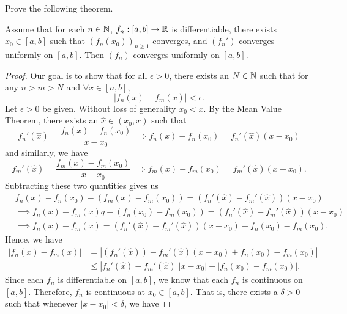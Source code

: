 \documentclass[a4paper]{article}
\begin{document}
\begin{problem}
    Prove the following theorem.
\end{problem}
\begin{theorem}[ ]
    Assume that for each \( n \in \mathbb{N} \), \( {f}_{n} : [a,b] \to \mathbb{R}  \) is differentiable, there exists \( {x}_{0} \in [a,b] \) such that \( ({f}_{n}({x}_{0}))_{n \geq 1} \) converges, and \( ({f}_{n}')  \) converges uniformly on \( [a,b] \). Then \( ({f}_{n}) \) converges uniformly on \( [a,b] \).
\end{theorem}
\begin{proof}
    Our goal is to show that for all \( \epsilon > 0  \), there exists an \( N \in \mathbb{N}  \) such that for any \( n > m > N  \) and \( \forall x \in [a,b] \),
    \[  | {f}_{n}(x) - {f}_{m}(x) | < \epsilon. \]
    Let \( \epsilon > 0  \) be given.  Without loss of generality \( {x}_{0} < x  \). By the Mean Value Theorem, there exists an \( \hat{x} \in ({x}_{0}, x) \) such that 
    \[  {f}_{n}'(\hat{x}) = \frac{ {f}_{n}(x) - {f}_{n}({x}_{0})  }{  x - {x}_{0} }  \implies {f}_{n}(x) - {f}_{n}({x}_{0}) = {f}_{n}'(\hat{x}) (x - {x}_{0}) \]
    and similarly, we have 
    \[  {f}_{m}'(\hat{x}) = \frac{ {f}_{m}(x) - {f}_{m}({x}_{0})  }{  x - {x}_{0}  }  \implies {f}_{m}(x) - {f}_{m}({x}_{0}) = {f}_{m}'(\hat{x}) (x - {x}_{0}). \]
    Subtracting these two quantities gives us
    \begin{align*}
        &{f}_{n}(x) - {f}_{n}({x}_{0})  - ({f}_{m}(x) - {f}_{m}({x}_{0}))   = ({f}_{n}'(\hat{x}) - {f}_{m}'(\hat{x}))(x - {x}_{0}) \\
        &\implies {f}_{n}(x) - {f}_{m}(x)q - ({f}_{n}({x}_{0}) - {f}_{m}({x}_{0})) = ({f}_{n}'(\hat{x}) - {f}_{m}'(\hat{x}))(x - {x}_{0}) \\
        &\implies {f}_{n}(x) - {f}_{m}(x) = ({f}_{n}'(\hat{x}) - {f}_{m}'(\hat{x}))(x - {x}_{0}) + {f}_{n}({x}_{0}) - {f}_{m}({x}_{0}).
    \end{align*}
    Hence, we have 
    \begin{align*}
        | {f}_{n}(x) - {f}_{m}(x)  | &= | ({f}_{n}'(\hat{x})) - {f}_{m}'(\hat{x}) (x - {x}_{0}) + {f}_{n}({x}_{0}) - {f}_{m}({x}_{0})|  \\ 
                                     &\leq | {f}_{n}'(\hat{x}) - {f}_{m}'(\hat{x}) | | x - {x}_{0} |  + | {f}_{n}({x}_{0}) - {f}_{m}({x}_{0}) |.
    \end{align*}
    Since each \( {f}_{n} \) is differentiable on \( [a,b] \), we know that each \( {f}_{n} \) is continuous on \( [a,b] \). Therefore, \( {f}_{n} \) is continuous at \( {x}_{0} \in [a,b] \). That is, there exists a \( \delta > 0  \) such that whenever \( |  x - {x}_{0} |  < \delta \), we have 

\end{proof}
\end{document}
